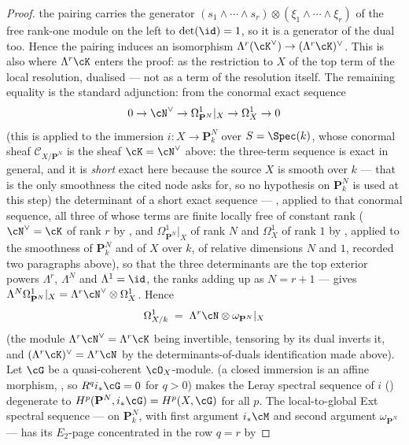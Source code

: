 \begin{proof}
the pairing carries the generator
$(s_1\wedge\cdots\wedge s_r)\otimes(\xi_1\wedge\cdots\wedge\xi_r)$ of
the free rank-one module on the left to $\det(\id)=1$, so it is a
generator of the dual too.  Hence the pairing induces an isomorphism
$\Lambda^r(\cK^{\vee})\to(\Lambda^r\cK)^{\vee}$.  This is also where
$\Lambda^r\cK$ enters the proof: as the restriction to $X$ of the top
term of the local resolution, dualised --- not as a term of the
resolution itself.  The remaining equality is the standard
adjunction: from the conormal exact sequence
\[
0\to\cN^{\vee}\to\Omega^1_{\mathbf P^N}|_X\to\Omega^1_X\to0
\]
(this is  applied to the immersion
$i:X\to\mathbf P^N_k$ over $S=\Spec(k)$, whose conormal sheaf
$\mathcal C_{X/\mathbf P^N}$ is the sheaf $\cK=\cN^{\vee}$ above: the
three-term sequence is exact in general, and it is \emph{short} exact
here because the source $X$ is smooth over $k$ --- that is the only
smoothness the cited node asks for, so no hypothesis on
$\mathbf P^N_k$ is used at this step) the determinant of a short exact
sequence --- , applied to that
conormal sequence, all three of whose terms are finite locally free of
constant rank ($\cN^{\vee}=\cK$ of rank $r$ by
, and
$\Omega^1_{\mathbf P^N}|_X$ of rank $N$ and $\Omega^1_X$ of rank $1$
by , applied to the smoothness of
$\mathbf P^N_k$ and of $X$ over $k$, of relative dimensions $N$ and $1$,
recorded two paragraphs above), so that the
three determinants are the top exterior powers $\Lambda^r$,
$\Lambda^N$ and $\Lambda^1=\id$, the ranks adding up as $N=r+1$ ---
gives $\Lambda^N\Omega^1_{\mathbf P^N}|_X
=\Lambda^r\cN^{\vee}\otimes\Omega^1_X$.  Hence
\[
\Omega^1_{X/k}\;=\;\Lambda^r\cN\otimes\omega_{\mathbf P^N}|_X
\]
(the module $\Lambda^r\cN^{\vee}=\Lambda^r\cK$ being invertible,
tensoring by its dual inverts it, and
$(\Lambda^r\cK)^{\vee}=\Lambda^r\cN$ by the determinants-of-duals
identification made above).
Let $\cG$ be a quasi-coherent $\cO_X$-module.  
(a closed immersion is an affine morphism,
, so $R^qi_*\cG=0$ for $q>0$) makes the
Leray spectral sequence of $i$ ()
degenerate to $H^p(\mathbf P^N,i_*\cG)=H^p(X,\cG)$ for all $p$.  The
local-to-global Ext spectral sequence ---  on
$\mathbf P^N_k$, with first argument $i_*\cM$ and second argument
$\omega_{\mathbf P^N}$ --- has its $E_2$-page concentrated in the row $q=r$ by

\end{proof}

